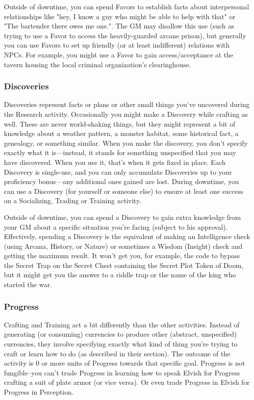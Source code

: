 Outside of downtime, you can spend Favors to establish facts about interpersonal relationships like "hey, I know a guy who might be able to help with that" or "The bartender there owes me one.". The GM may disallow this use (such as trying to use a Favor to access the heavily-guarded arcane prison), but generally you can use Favors to set up friendly (or at least indifferent) relations with NPCs. For example, you might use a Favor to gain access/acceptance at the tavern housing the local criminal organization's clearinghouse.

\subsubsection{Discoveries}
Discoveries represent facts or plans or other small things you've uncovered during the Research activity. Occasionally you might make a Discovery while crafting as well. These are never world-shaking things, but they might represent a bit of knowledge about a weather pattern, a monster habitat, some historical fact, a genealogy, or something similar. When you make the discovery, you don't specify exactly what it is---instead, it stands for something unspecified that you may have discovered. When you use it, that's when it gets fixed in place. Each Discovery is single-use, and you can only accumulate Discoveries up to your proficiency bonus---any additional ones gained are lost. During downtime, you can use a Discovery (for yourself or someone else) to ensure at least one success on a Socializing, Trading or Training activity.

Outside of downtime, you can spend a Discovery to gain extra knowledge from your GM about a specific situation you're facing (subject to his approval). Effectively, spending a Discovery is the equivalent of making an Intelligence check (using Arcana, History, or Nature) or sometimes a Wisdom (Insight) check and getting the maximum result. It won't get you, for example, the code to bypass the Secret Trap on the Secret Chest containing the Secret Plot Token of Doom, but it might get you the answer to a riddle trap or the name of the king who started the war.

\subsubsection{Progress}
Crafting and Training act a bit differently than the other activities. Instead of generating (or consuming) currencies to produce other (abstract, unspecified) currencies, they involve specifying exactly what kind of thing you're trying to craft or learn how to do (as described in their section). The outcome of the activity is 0 or more units of Progress towards that specific goal. Progress is not fungible--you can't trade Progress in learning how to speak Elvish for Progress crafting a suit of plate armor (or vice versa). Or even trade Progress in Elvish for Progress in Perception.

